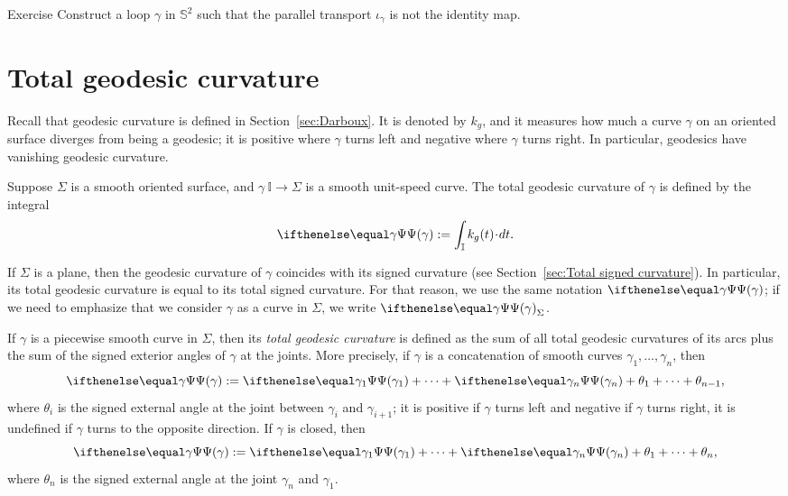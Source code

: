 \begin{thm}{Exercise}\label{ex:holonomy=not0}
Construct a loop $\gamma$ in $\mathbb{S}^2$ such that the parallel transport $\iota_\gamma$ is not the identity map.
\end{thm}

\section{Total geodesic curvature}

Recall that geodesic curvature is defined in Section~\ref{sec:Darboux}.
It is denoted by $k_g$, and it measures how much a curve $\gamma$ on an oriented surface diverges from being a geodesic;
it is positive where $\gamma$ turns left and negative where $\gamma$ turns right.
In particular, geodesics have vanishing geodesic curvature.

Suppose $\Sigma$ is a smooth oriented surface, and $\gamma\:\mathbb{I}\to \Sigma$ is a smooth unit-speed curve.
The total geodesic curvature of $\gamma$ is defined by the integral 
\[\tgc\gamma
\df
\int_{\mathbb{I}} k_g(t)\cdot dt.\]

If $\Sigma$ is a plane, then the geodesic curvature of $\gamma$ coincides
with its signed curvature (see Section~\ref{sec:Total signed curvature}). 
In particular, its total geodesic curvature is equal to its total signed curvature.
For that reason, we use the same notation $\tgc\gamma$; if we need to emphasize that we consider $\gamma$ as a curve in $\Sigma$, we write $\tgc\gamma_\Sigma$.

If $\gamma$ is a piecewise smooth curve in $\Sigma$, then
its \emph{total geodesic curvature} is defined as the sum of all total geodesic curvatures of its arcs plus the sum of the signed exterior angles of $\gamma$ at the joints.
More precisely, if $\gamma$ is a concatenation of smooth curves $\gamma_1,\dots,\gamma_n$, then
\[\tgc\gamma
\df
\tgc{\gamma_1}+\dots+\tgc{\gamma_n}+\theta_1+\dots+\theta_{n-1},\]
where $\theta_i$ is the signed external angle at the joint between $\gamma_i$ and $\gamma_{i+1}$;
it is positive if $\gamma$ turns left and negative if $\gamma$ turns right, it is undefined if $\gamma$ turns to the opposite direction.
If $\gamma$ is closed, then 
\[\tgc\gamma
\df
\tgc{\gamma_1}+\dots+\tgc{\gamma_n}+\theta_1+\dots+\theta_n,\]
where $\theta_n$ is the signed external angle at the joint $\gamma_n$ and $\gamma_1$.

